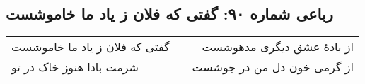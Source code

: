 \begin{center}
\section*{رباعی شماره ۹۰: گفتی که فلان ز یاد ما خاموشست}
\label{sec:sh090}
\begin{longtable}{l p{0.5cm} r}
گفتی که فلان ز یاد ما خاموشست
&&
از بادهٔ عشق دیگری مدهوشست
\\
شرمت بادا هنوز خاک در تو
&&
از گرمی خون دل من در جوشست
\\
\end{longtable}
\end{center}

